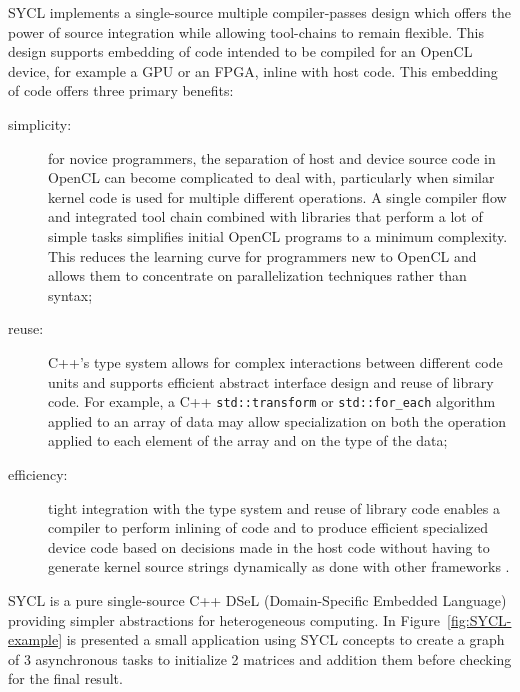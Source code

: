 \documentclass[sigplan]{acmart}
\begin{document}
SYCL implements a single-source multiple compiler-passes design which
offers the power of source integration while allowing tool-chains to
remain flexible. This design supports embedding of code intended to be
compiled for an OpenCL device, for example a GPU or an FPGA, inline
with host code. This embedding of code offers three primary benefits:
\begin{description}
\item[simplicity:] for novice programmers, the separation of host and
  device source code in OpenCL can become complicated to deal with,
  particularly when similar kernel code is used for multiple different
  operations. A single compiler flow and integrated tool chain
  combined with libraries that perform a lot of simple tasks
  simplifies initial OpenCL programs to a minimum complexity. This
  reduces the learning curve for programmers new to OpenCL and allows
  them to concentrate on parallelization techniques rather than
  syntax;
\item[reuse:] C++'s type system allows for complex interactions
  between different code units and supports efficient abstract
  interface design and reuse of library code.  For example, a C++
  \lstinline{std::transform} or \lstinline{std::for_each} algorithm
  applied to an array of data may allow specialization on both the
  operation applied to each element of the array and on the type of
  the data;
\item[efficiency:] tight integration with the type system and reuse of
  library code enables a compiler to perform inlining of code and to
  produce efficient specialized device code based on decisions made in
  the host code without having to generate kernel source strings
  dynamically as done with other frameworks \cite{VexCL,
    Boost.Compute}.
\end{description}

SYCL is a pure single-source C++ DSeL (Domain-Specific Embedded
Language) providing simpler abstractions for heterogeneous
computing. In Figure~\ref{fig:SYCL-example} is presented a small
application using SYCL concepts to create a graph of 3 asynchronous
tasks to initialize 2 matrices and addition them before checking for
the final result.
\end{document}
